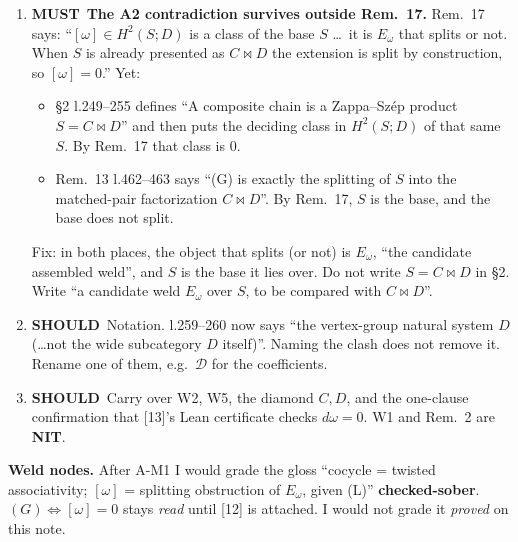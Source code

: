 \documentclass[10pt]{article}
\newcommand{\MU}{\textbf{MUST}}
\newcommand{\SH}{\textbf{SHOULD}}
\newcommand{\NI}{\textbf{NIT}}
\begin{document}
\begin{enumerate}[label=\textbf{A-M\arabic*}]
\item \MU\ \textbf{The A2 contradiction survives outside Rem.~17.} Rem.~17 says: ``$[\omega]\in H^2(S;D)$ is a
class of the base $S$ \dots\ it is $E_\omega$ that splits or not. When $S$ is already presented as $C\bowtie D$ the
extension is split by construction, so $[\omega]=0$.'' Yet:
\begin{itemize}
\item \S2 l.249--255 defines ``A composite chain is a Zappa--Sz\'ep product $S=C\bowtie D$'' and then puts the deciding
class in $H^2(S;D)$ of that same $S$. By Rem.~17 that class is $0$.
\item Rem.~13 l.462--463 says ``(G) is exactly the splitting of $S$ into the matched-pair factorization $C\bowtie D$''.
By Rem.~17, $S$ is the base, and the base does not split.
\end{itemize}
Fix: in both places, the object that splits (or not) is $E_\omega$, ``the candidate assembled weld'', and $S$ is
the base it lies over. Do not write $S=C\bowtie D$ in \S2. Write ``a candidate weld $E_\omega$ over $S$, to be compared
with $C\bowtie D$''.
\item \SH\ Notation. l.259--260 now says ``the vertex-group natural system $D$ (\dots not the wide subcategory $D$
itself)''. Naming the clash does not remove it. Rename one of them, e.g.\ $\mathcal D$ for the coefficients.
\item \SH\ Carry over W2, W5, the diamond $C,D$, and the one-clause confirmation that [13]'s Lean certificate
checks $d\omega=0$. W1 and Rem.~2 are \NI.
\end{enumerate}
\textbf{Weld nodes.} After A-M1 I would grade the gloss ``cocycle = twisted associativity; $[\omega]$ = splitting
obstruction of $E_\omega$, given (L)'' \textbf{checked-sober}. $(G)\Leftrightarrow[\omega]=0$ stays \emph{read} until
[12] is attached. I would not grade it \emph{proved} on this note.
\end{document}
